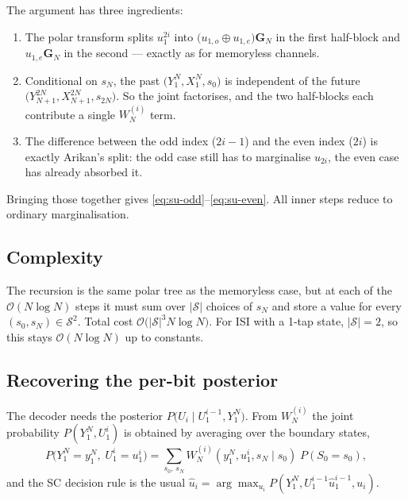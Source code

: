 \documentclass[11pt]{article}
\newcommand{\bbY}{Y}
\newcommand{\bbS}{S}
\newcommand{\bbU}{U}
\newcommand{\bbX}{X}
\newcommand{\BigOh}{\mathcal{O}}
\begin{document}
The argument has three ingredients:
\begin{enumerate}[leftmargin=*]
\item The polar transform splits $u_1^{2i}$ into
      $\bigl(u_{1,o}\oplus u_{1,e}\bigr) \mathbf{G}_N$ in the first half-block and
      $u_{1,e}\mathbf{G}_N$ in the second --- exactly as for memoryless channels.
\item Conditional on $s_N$, the past $\bigl(\bbY_1^N, \bbX_1^N, s_0\bigr)$
      is independent of the future $\bigl(\bbY_{N+1}^{2N}, \bbX_{N+1}^{2N}, s_{2N}\bigr)$.
      So the joint factorises, and the two half-blocks each contribute a
      single $W_N^{(i)}$ term.
\item The difference between the odd index ($2i-1$) and the even index
      ($2i$) is exactly Arikan's split: the odd case still has to marginalise
      $u_{2i}$, the even case has already absorbed it.
\end{enumerate}
Bringing those together gives \eqref{eq:su-odd}--\eqref{eq:su-even}.  All
inner steps reduce to ordinary marginalisation.

\subsection{Complexity}

The recursion is the same polar tree as the memoryless case, but at each of
the $\BigOh(N\log N)$ steps it must sum over $|\mathcal{S}|$ choices of
$s_N$ and store a value for every $(s_0, s_N) \in \mathcal{S}^2$.  Total
cost $\BigOh\bigl(|\mathcal{S}|^3 N \log N\bigr)$.  For ISI with a 1-tap
state, $|\mathcal{S}|=2$, so this stays $\BigOh(N\log N)$ up to constants.

\subsection{Recovering the per-bit posterior}

The decoder needs the posterior $P\bigl(\bbU_i \mid \bbU_1^{i-1}, \bbY_1^N\bigr)$.
From $W_N^{(i)}$ the joint probability
$P(\bbY_1^N, \bbU_1^i)$ is obtained by averaging over the boundary states,
\begin{equation}\label{eq:marginal}
  P\bigl(\bbY_1^N=y_1^N,\; \bbU_1^i=u_1^i\bigr)
  = \sum_{s_0,\,s_N} W_N^{(i)}(y_1^N, u_1^i, s_N\mid s_0)\;P(\bbS_0=s_0),
\end{equation}
and the SC decision rule is the usual $\hat{u}_i = \arg\max_{u_i}
P(\bbY_1^N, \bbU_1^{i-1}\hat{u}_1^{i-1}, u_i)$.
\end{document}
